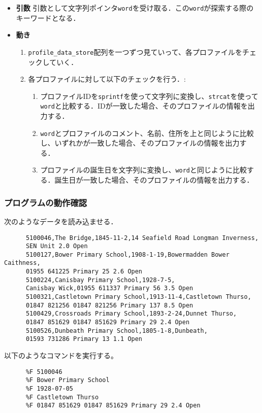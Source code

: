       \begin{itemize}
        \item \textbf{引数} 引数として文字列ポインタ\texttt{word}を受け取る．この\texttt{word}が探索する際のキーワードとなる．
        \item \textbf{動き}
        \begin{enumerate}
          \item \texttt{profile\_data\_store}配列を一つずつ見ていって、各プロファイルをチェックしていく．
          \item 各プロファイルに対して以下のチェックを行う．:
          \begin{enumerate}
            \item プロファイルIDを\texttt{sprintf}を使って文字列に変換し、\texttt{strcat}を使って\texttt{word}と比較する．IDが一致した場合、そのプロファイルの情報を出力する．
            \item \texttt{word}とプロファイルのコメント、名前、住所を上と同じように比較し、いずれかが一致した場合、そのプロファイルの情報を出力する．
            \item プロファイルの誕生日を文字列に変換し、\texttt{word}と同じように比較する．誕生日が一致した場合、そのプロファイルの情報を出力する．
          \end{enumerate}
        \end{enumerate}
      \end{itemize}
      \subsubsection{プログラムの動作確認}
      次のようなデータを読み込ませる．
      \begin{verbatim}
      5100046,The Bridge,1845-11-2,14 Seafield Road Longman Inverness,
      SEN Unit 2.0 Open
      5100127,Bower Primary School,1908-1-19,Bowermadden Bower Caithness,
      01955 641225 Primary 25 2.6 Open
      5100224,Canisbay Primary School,1928-7-5,
      Canisbay Wick,01955 611337 Primary 56 3.5 Open
      5100321,Castletown Primary School,1913-11-4,Castletown Thurso,
      01847 821256 01847 821256 Primary 137 8.5 Open
      5100429,Crossroads Primary School,1893-2-24,Dunnet Thurso,
      01847 851629 01847 851629 Primary 29 2.4 Open
      5100526,Dunbeath Primary School,1805-1-8,Dunbeath,
      01593 731286 Primary 13 1.1 Open
      \end{verbatim}
      
      以下のようなコマンドを実行する。
      \begin{verbatim}
      %F 5100046
      %F Bower Primary School
      %F 1928-07-05
      %F Castletown Thurso
      %F 01847 851629 01847 851629 Primary 29 2.4 Open
      \end{verbatim}
      
